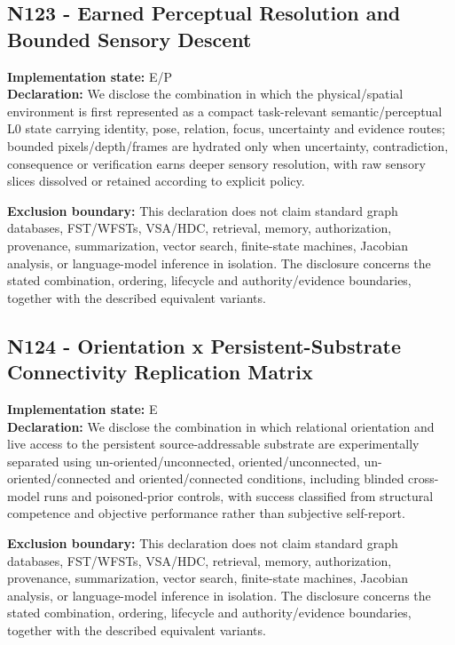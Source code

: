 \documentclass[
  10pt,
  letterpaper,
]{article}
\begin{document}
\subsection{N123 - Earned Perceptual Resolution and Bounded Sensory
Descent}\label{n123---earned-perceptual-resolution-and-bounded-sensory-descent}

\textbf{Implementation state:} E/P\\
\textbf{Declaration:} We disclose the combination in which the
physical/spatial environment is first represented as a compact
task-relevant semantic/perceptual L0 state carrying identity, pose,
relation, focus, uncertainty and evidence routes; bounded
pixels/depth/frames are hydrated only when uncertainty, contradiction,
consequence or verification earns deeper sensory resolution, with raw
sensory slices dissolved or retained according to explicit policy.

\textbf{Exclusion boundary:} This declaration does not claim standard
graph databases, FST/WFSTs, VSA/HDC, retrieval, memory, authorization,
provenance, summarization, vector search, finite-state machines,
Jacobian analysis, or language-model inference in isolation. The
disclosure concerns the stated combination, ordering, lifecycle and
authority/evidence boundaries, together with the described equivalent
variants.

\subsection{N124 - Orientation x Persistent-Substrate Connectivity
Replication
Matrix}\label{n124---orientation-x-persistent-substrate-connectivity-replication-matrix}

\textbf{Implementation state:} E\\
\textbf{Declaration:} We disclose the combination in which relational
orientation and live access to the persistent source-addressable
substrate are experimentally separated using un-oriented/unconnected,
oriented/unconnected, un-oriented/connected and oriented/connected
conditions, including blinded cross-model runs and poisoned-prior
controls, with success classified from structural competence and
objective performance rather than subjective self-report.

\textbf{Exclusion boundary:} This declaration does not claim standard
graph databases, FST/WFSTs, VSA/HDC, retrieval, memory, authorization,
provenance, summarization, vector search, finite-state machines,
Jacobian analysis, or language-model inference in isolation. The
disclosure concerns the stated combination, ordering, lifecycle and
authority/evidence boundaries, together with the described equivalent
variants.
\end{document}
